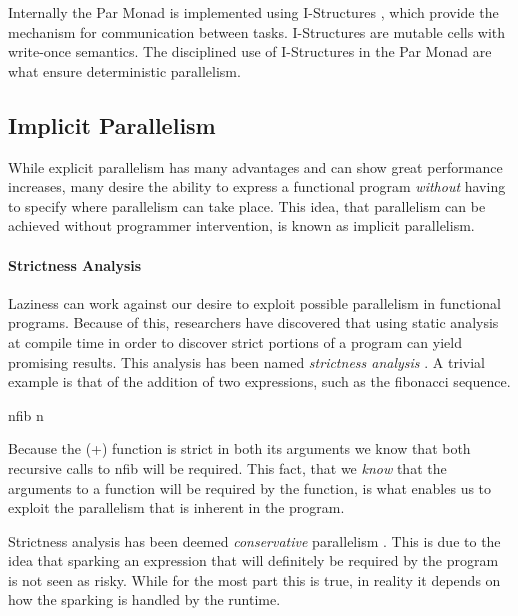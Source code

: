 Internally the \<Par\> Monad is implemented using I-Structures
\citep{Arvind:IStructures}, which provide the mechanism for communication
between tasks. I-Structures are mutable cells with write-once semantics.
The disciplined use of I-Structures in the \<Par\> Monad are what ensure
deterministic parallelism.



 \subsection{Implicit Parallelism}
   While explicit parallelism has many advantages and can show great performance
increases, many desire the ability to express a functional program
\emph{without} having to specify where parallelism can take place. This idea,
that parallelism can be achieved without programmer intervention, is known as
implicit parallelism.

  \paragraph{Strictness Analysis}
    Laziness can work against our desire to exploit possible parallelism in
functional programs. Because of this, researchers have discovered that using
static analysis at compile time in order to discover strict portions of a
program can yield promising results. This analysis has been named
\emph{strictness analysis} \citep{ritabook, SPJ:PIFPL}. A trivial example is that
of the addition of two expressions, such as the fibonacci sequence.

\begin{haskell}
nfib n 
\end{haskell}

Because the \<(+)\> function is strict in both its arguments we know that
both recursive calls to \<nfib\> will be required. This fact, that we
\emph{know} that the arguments to a function will be required by the function,
is what enables us to exploit the parallelism that is inherent in the program.

    Strictness analysis has
been deemed \emph{conservative} parallelism \citep{SPJ:PIFPL}. This is due to
the idea that sparking an expression that will definitely be required by the
program is not seen as risky. While for the most part this is true, in reality
it depends on how the sparking is handled by the runtime.

